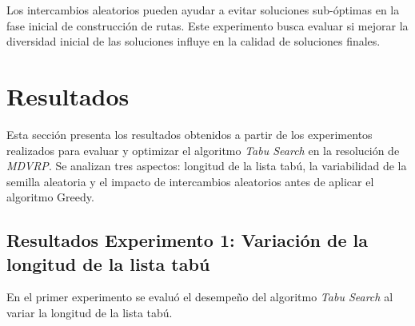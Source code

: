 \documentclass[letter, 10pt]{article}
\begin{document}
Los intercambios aleatorios pueden ayudar a evitar soluciones sub-óptimas en la fase inicial de construcción de rutas. Este experimento busca evaluar si mejorar la diversidad inicial de las soluciones influye en la calidad de soluciones finales.


\section{Resultados}

Esta sección presenta los resultados obtenidos a partir de los experimentos realizados para evaluar y optimizar el algoritmo \textit{Tabu Search} en la resolución de \textit{MDVRP}. Se analizan tres aspectos: longitud de la lista tabú, la variabilidad de la semilla aleatoria y el impacto de intercambios aleatorios antes de aplicar el algoritmo Greedy.

\subsection{Resultados Experimento 1: Variación de la longitud de la lista tabú}

En el primer experimento se evaluó el desempeño del algoritmo \textit{Tabu Search} al variar la longitud de la lista tabú.
\end{document}

